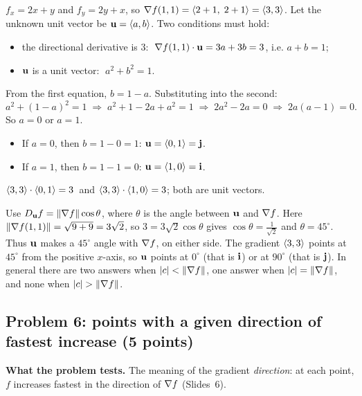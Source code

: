  $f_x=2x+y$ and $f_y=2y+x$, so
$\nabla f(1,1)=\left\langle 2+1,\;2+1 \right\rangle=\left\langle 3,3 \right\rangle$.
 Let the unknown unit vector be $\mathbf{u}=\left\langle a,b \right\rangle$. Two
conditions must hold:
\begin{itemize}
\item the directional derivative is $3$: $\;\nabla f(1,1)\cdot\mathbf{u}=3a+3b=3$, i.e. $a+b=1$;
\item $\mathbf{u}$ is a unit vector: $\;a^2+b^2=1$.
\end{itemize}
 From the first equation, $b=1-a$. Substituting into the second:
\[
  a^2+(1-a)^2=1\;\Longrightarrow\;a^2+1-2a+a^2=1\;\Longrightarrow\;2a^2-2a=0\;\Longrightarrow\;2a(a-1)=0 .
\]
So $a=0$ or $a=1$.
\begin{itemize}
\item If $a=0$, then $b=1-0=1$: $\mathbf{u}=\left\langle 0,1 \right\rangle=\mathbf{j}$.
\item If $a=1$, then $b=1-1=0$: $\mathbf{u}=\left\langle 1,0 \right\rangle=\mathbf{i}$.
\end{itemize}
 $\left\langle 3,3 \right\rangle\cdot\left\langle 0,1 \right\rangle=3$\checkok\ and $\left\langle 3,3 \right\rangle\cdot\left\langle 1,0 \right\rangle=3$\checkok; both are unit vectors.


\begin{altmethod}
Use $D_{\mathbf{u}} f=\lVert\nabla f\rVert\cos\theta$, where $\theta$ is the angle between $\mathbf{u}$ and
$\nabla f$. Here $\lVert\nabla f(1,1)\rVert=\sqrt{9+9}=3\sqrt2$, so $3=3\sqrt2\cos\theta$ gives
$\cos\theta=\frac{1}{\sqrt2}$ and $\theta=45^\circ$. Thus $\mathbf{u}$ makes a $45^\circ$
angle with $\nabla f$, on either side. The gradient $\left\langle 3,3 \right\rangle$ points at $45^\circ$
from the positive $x$-axis, so $\mathbf{u}$ points at $0^\circ$ (that is $\mathbf{i}$) or at
$90^\circ$ (that is $\mathbf{j}$). In general there are two answers when
$\lvert c\rvert<\lVert\nabla f\rVert$, one answer when $\lvert c\rvert=\lVert\nabla f\rVert$, and none when
$\lvert c\rvert>\lVert\nabla f\rVert$.
\end{altmethod}


\subsection{Problem 6: points with a given direction of fastest increase (5 points)}

\textbf{What the problem tests.} The meaning of the gradient \emph{direction}: at
each point, $f$ increases fastest in the direction of $\nabla f$ (Slides~6).

